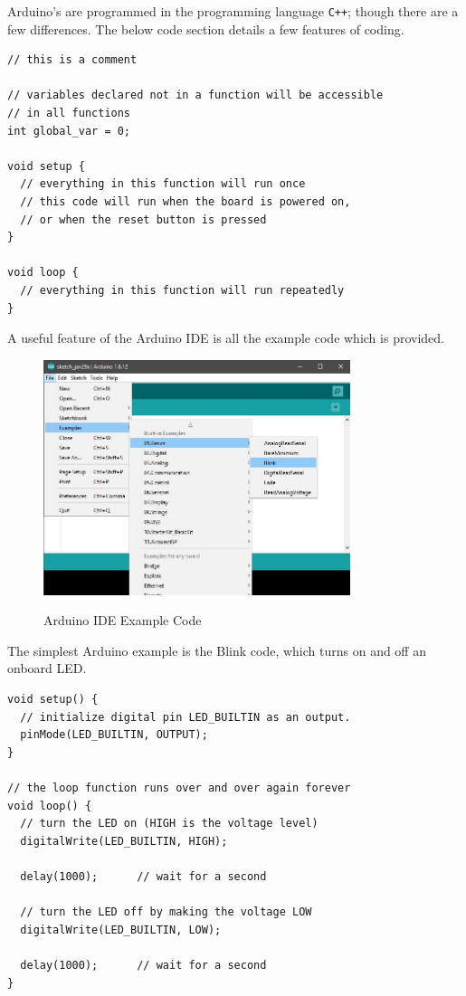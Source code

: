 \documentclass[a4paper,12pt]{article}
\begin{document}
Arduino's are programmed in the programming language \lstinline[]!C++!; though there are a few differences. The below code section details a few features of coding.


\begin{lstlisting}
// this is a comment

// variables declared not in a function will be accessible
// in all functions
int global_var = 0;

void setup {
  // everything in this function will run once
  // this code will run when the board is powered on, 
  // or when the reset button is pressed
}

void loop {
  // everything in this function will run repeatedly
}

\end{lstlisting}
\bigskip

\pagebreak
A useful feature of the Arduino IDE is all the example code which is provided.
\begin{figure}
    \centering
    \includegraphics[width=0.8\textwidth]{arduino_ide_blink_example.jpg}
    \label{fig:ide-blink}
    \caption{Arduino IDE Example Code}
\end{figure}

The simplest Arduino example is the Blink code, which turns on and off an onboard LED.

\begin{lstlisting}
void setup() {
  // initialize digital pin LED_BUILTIN as an output.
  pinMode(LED_BUILTIN, OUTPUT);
}

// the loop function runs over and over again forever
void loop() {
  // turn the LED on (HIGH is the voltage level)
  digitalWrite(LED_BUILTIN, HIGH); 

  delay(1000);      // wait for a second

  // turn the LED off by making the voltage LOW
  digitalWrite(LED_BUILTIN, LOW);  
  
  delay(1000);      // wait for a second
}
\end{lstlisting}
\end{document}
